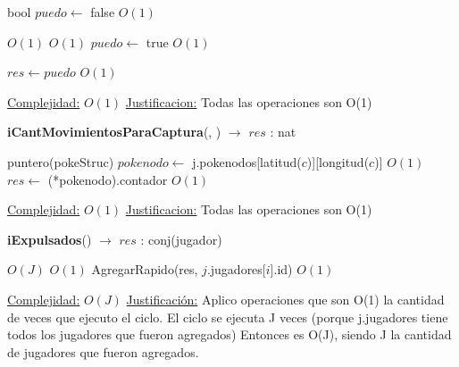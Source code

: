 \begin{Algoritmos}
\begin{algorithm}[H]
\begin{algorithmic}[1]
\State bool $puedo \gets$ false  \Comment $O(1)$

   \Comment $O(1)$
       \Comment $O(1)$
        \State $puedo \gets$ true        \Comment $O(1)$
    \EndIf
\EndIf

\State $res \gets puedo$  \Comment $O(1)$

\medskip
\State \underline{Complejidad:} $O(1)$
\State \underline{Justificacion:} Todas las operaciones son O(1)

\end{algorithmic}
\end{algorithm}



\begin{algorithm}[H]
{\textbf{iCantMovimientosParaCaptura}(, ) $\to$ $res$ :    nat}
\begin{algorithmic}[1]

\State puntero(pokeStruc) $pokenodo \gets$ j.pokenodos[latitud($c$)][longitud($c$)] \Comment $O(1)$
\State $res \gets$ (*pokenodo).contador  \Comment $O(1)$

\medskip
\State \underline{Complejidad:} $O(1)$
\State \underline{Justificacion:} Todas las operaciones son O(1)

\end{algorithmic}
\end{algorithm}



\begin{algorithm}[H]
{\textbf{iExpulsados}() $\to$ $res$ : conj(jugador)}
\begin{algorithmic}[1]

   \Comment $O(J)$
       \Comment $O(1)$
        \State AgregarRapido(res, $j$.jugadores[$i$].id)  \Comment $O(1)$        
    \EndIf
\EndFor

\medskip
\State \underline{Complejidad:} $O(J)$
\State \underline{Justificaci\'on:} Aplico operaciones que son O(1) la cantidad de veces que ejecuto el ciclo. El ciclo se ejecuta J veces (porque j.jugadores tiene todos los jugadores que fueron agregados) Entonces es O(J), siendo J la cantidad de jugadores que fueron agregados.

\end{algorithmic}
\end{algorithm}



\end{Algoritmos}
